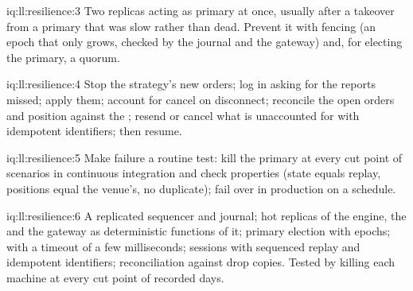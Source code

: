 \begin{solution}{iq:ll:resilience:3}
Two replicas acting as primary at once, usually after a takeover from a primary that was slow rather than dead. Prevent it with
fencing (an epoch that only grows, checked by the journal and the gateway) and, for electing the primary, a quorum.
\end{solution}

\begin{solution}{iq:ll:resilience:4}
Stop the strategy's new orders; log in asking for the reports missed; apply them; account for cancel on disconnect; reconcile
the open orders and position against the ; resend or cancel what is unaccounted for with idempotent identifiers; then
resume.
\end{solution}

\begin{solution}{iq:ll:resilience:5}
Make failure a routine test: kill the primary at every cut point of scenarios in continuous integration and check properties
(state equals replay, positions equal the venue's, no duplicate); fail over in production on a schedule.
\end{solution}

\begin{solution}{iq:ll:resilience:6}
A replicated sequencer and journal; hot replicas of the engine, the  and the gateway as deterministic functions of it;
primary election with epochs;  with a timeout of a few milliseconds; sessions with sequenced replay and idempotent
identifiers; reconciliation against drop copies. Tested by killing each machine at every cut point of recorded days.
\end{solution}
